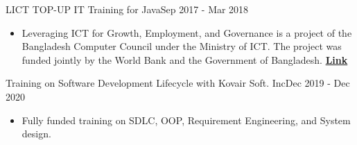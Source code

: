   \customSubHeadingContentStart
  
    \customSubHeading
      {LICT TOP-UP IT Training for Java}{Sep 2017 - Mar 2018}
      \begin{itemize}[itemsep=-3pt, left=0pt]
        \item {Leveraging ICT for Growth, Employment, and Governance is a project of the Bangladesh Computer Council under the Ministry of ICT. The project was funded jointly by the World Bank and the Government of Bangladesh.}
        \textbf{{\href{https://documents.worldbank.org/en/publication/documents-reports/documentdetail/157261468200634239/bangladesh-leveraging-ict-for-governance-growth-and-employment-project}{Link}}}
    \end{itemize}
    \vspace{-10pt}
      
      
    \customSubHeading
      {Training on Software Development Lifecycle with Kovair Soft. Inc}{Dec 2019 - Dec 2020}
     \begin{itemize}[itemsep=-3pt, left=0pt]
        \item{Fully funded training on SDLC, OOP, Requirement Engineering, and System design.}
    \end{itemize}
    \vspace{-10pt}

  \customSubHeadingContentEnd
\vspace{-6pt}